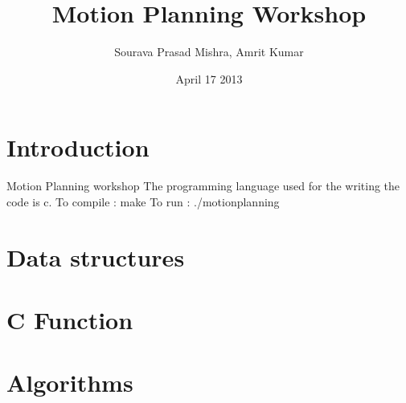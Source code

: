 \documentclass{report}
\title{Motion Planning Workshop}
\author{Sourava Prasad Mishra, Amrit Kumar}
\date{April 17 2013}
\begin{document}
\maketitle

\section*{Introduction}
Motion Planning workshop
The programming language used for the writing the code is c.
To compile	: make
To run		: ./motionplanning

\section*{Data structures}
\section*{C Function}
\section*{Algorithms}
\end{document}
